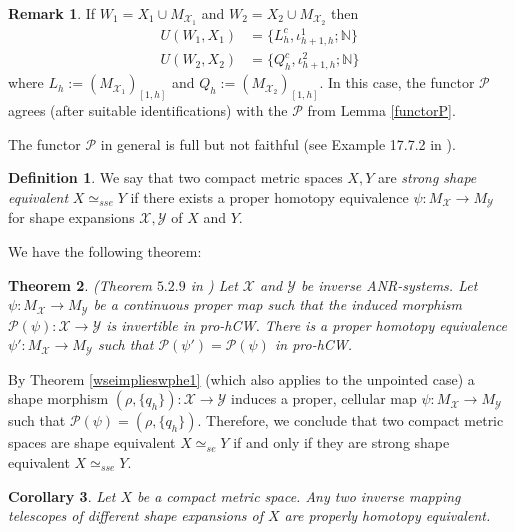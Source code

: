 \documentclass[a4paper,11pt]{article}
\theoremstyle{definition}
\newtheorem{definition}{Definition}[section]
\newtheorem*{remark}{Remark}
\theoremstyle{plain}
\newtheorem{theorem}[definition]{Theorem}
\newtheorem{cor}[definition]{Corollary}
\theoremstyle{remark}
\begin{document}
{\begin{remark} If $W_1= X_1\cup M_{\mathcal{X}_1}$ and $W_{2} = X_{2} \cup M_{\mathcal{X}_{2}}$ then 
\begin{align*}
U(W_1,X_{1})&=\{L^c_{h},\iota^1_{h+1,h};\mathbb{N}\}\\
 U(W_2,X_{2})&=\{Q^c_{h},\iota^2_{h+1,h};\mathbb{N}\}
\end{align*}
where $L_{h}:=(M_{\mathcal{X}_1})_{[1,h]}$ and $Q_{h}:=(M_{\mathcal{X}_2})_{[1,h]}$. In this case, the functor $\mathcal{P}$ agrees (after suitable identifications) with the $\mathcal{P}$ from Lemma \ref{functorP}.
\end{remark}

The functor $\mathcal{P}$ in general is full but not faithful (see Example 17.7.2 in \cite{geoghegan2007topological}). 

\begin{definition} We say that two compact metric spaces $X,Y$ are \textit{strong shape equivalent} $X\simeq_{sse} Y$ if there exists a proper homotopy equivalence $\psi: M_{\mathcal{X}}\rightarrow M_{\mathcal{Y}}$ for shape expansions $\mathcal{X},\mathcal{Y}$ of $X$ and $Y$.
\end{definition}

We have the following theorem:

\begin{theorem} \label{SSandS} (Theorem $5.2.9$ in \cite{edwards2006cech}) Let $\mathcal{X}$ and $\mathcal{Y}$ be inverse ANR-systems. Let  $\psi: M_{\mathcal{X}}\rightarrow M_{\mathcal{Y}}$ be a continuous proper map such that the induced morphism $\mathcal{P}(\psi): \mathcal{X}\rightarrow \mathcal{Y}$ is invertible in pro-hCW. There is a proper homotopy equivalence $\psi': M_{\mathcal{X}}\rightarrow M_{\mathcal{Y}}$ such that $\mathcal{P}(\psi')=\mathcal{P}(\psi)$ in pro-hCW.
\end{theorem}

By Theorem \ref{wseimplieswphe1} (which also applies to the unpointed case) a shape morphism $(\rho, \{q_{h}\}): \mathcal{X}\rightarrow \mathcal{Y}$ induces a proper, cellular map $\psi: M_{\mathcal{X}}\rightarrow M_{\mathcal{Y}}$ such that $\mathcal{P}(\psi) = (\rho, \{q_{h}\})$. Therefore, we conclude that two compact metric spaces are shape equivalent $X\simeq_{se}Y$ if and only if they are strong shape equivalent $X\simeq_{sse}Y$. 

\begin{cor} Let $X$ be a compact metric space. Any two inverse mapping telescopes of different shape expansions of $X$ are properly homotopy equivalent. 
\end{cor}

}
\end{document}
